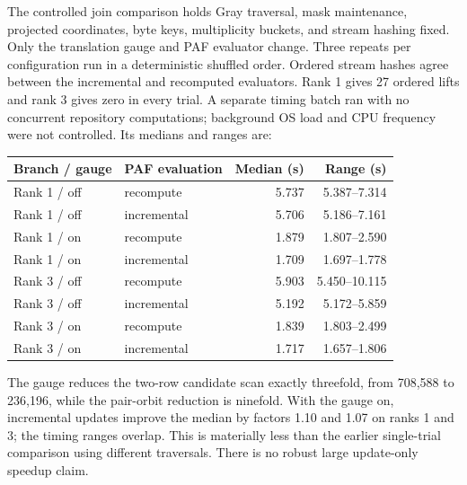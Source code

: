 \documentclass[11pt]{article}
\begin{document}
The controlled join comparison holds Gray traversal, mask maintenance,
projected coordinates, byte keys, multiplicity buckets, and stream hashing
fixed. Only the translation gauge and PAF evaluator change. Three repeats
per configuration run in a deterministic shuffled order. Ordered stream
hashes agree between the incremental and recomputed evaluators. Rank 1 gives
27 ordered lifts and rank 3 gives zero in every trial. A separate timing
batch ran with no concurrent repository computations; background OS load and
CPU frequency were not controlled. Its medians and ranges are:
\begin{center}
\begin{tabular}{llrr}
\toprule
Branch / gauge & PAF evaluation & Median (s) & Range (s)\\
\midrule
Rank 1 / off & recompute & 5.737 & 5.387--7.314\\
Rank 1 / off & incremental & 5.706 & 5.186--7.161\\
Rank 1 / on & recompute & 1.879 & 1.807--2.590\\
Rank 1 / on & incremental & 1.709 & 1.697--1.778\\
Rank 3 / off & recompute & 5.903 & 5.450--10.115\\
Rank 3 / off & incremental & 5.192 & 5.172--5.859\\
Rank 3 / on & recompute & 1.839 & 1.803--2.499\\
Rank 3 / on & incremental & 1.717 & 1.657--1.806\\
\bottomrule
\end{tabular}
\end{center}
The gauge reduces the two-row candidate scan exactly threefold,
from 708,588 to 236,196, while the pair-orbit reduction is ninefold.
With the gauge on, incremental updates improve the median by factors 1.10
and 1.07 on ranks 1 and 3; the timing ranges overlap. This is materially
less than the earlier single-trial comparison using different traversals.
There is no robust large update-only speedup claim.
\end{document}
